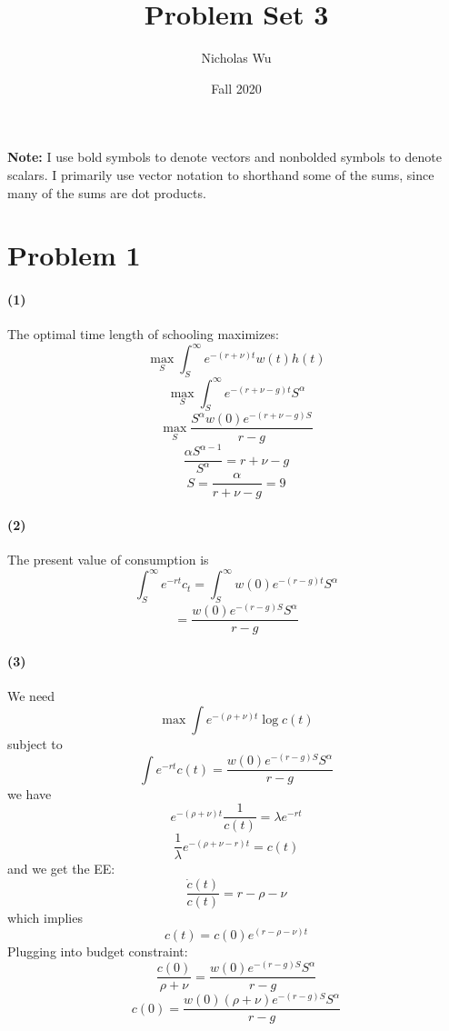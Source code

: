 \documentclass[10pt,letter]{article}
\newcommand{\problem}[1]{\section*{Problem #1}}
\newcommand{\problempart}[1]{\paragraph{#1}}
\begin{document}


\title{Problem Set 3}

\author{Nicholas Wu}

\date{Fall 2020}

\maketitle
\textbf{Note:} I use bold symbols to denote vectors and nonbolded symbols to denote scalars. I primarily use vector notation to shorthand some of the sums, since many of the sums are dot products.

\problem{1}

\problempart{(1)}
The optimal time length of schooling maximizes:
\[ \max_S \int_S^\infty e^{-(r + \nu)t}w(t)h(t) \]
\[ \max_S \int_S^\infty e^{-(r+ \nu - g)t}S^{\alpha} \]
\[ \max_S \frac{S^{\alpha}w(0)e^{-(r+ \nu-g)S}}{r-g} \]
\[ \frac{\alpha S^{\alpha - 1}}{S^\alpha} = r+ \nu-g\]
\[  S = \frac{\alpha}{r+ \nu-g} = 9\]
\problempart{(2)}
The present value of consumption is
\[ \int_S^\infty e^{-rt}c_t = \int_S^\infty w(0) e^{-(r-g)t}S^\alpha \]
\[  = \frac{w(0) e^{-(r-g)S}S^\alpha }{r-g}\]
\problempart{(3)}
We need
\[ \max  \int e^{-(\rho + \nu)t} \log c(t) \]
subject to
\[ \int e^{- rt}c(t) = \frac{w(0) e^{-(r-g)S}S^\alpha }{r-g} \]
we have
\[ e^{-(\rho + \nu)t} \frac{1}{c(t)} = \lambda e^{-rt}\]
\[ \frac{1}{\lambda }e^{-(\rho + \nu - r)t}  = c(t) \]
and we get the EE:
\[ \frac{\dot{c}(t)}{c(t)}= r - \rho - \nu  \]
which implies
\[ c(t) = c(0) e^{(r-\rho-\nu)t} \]
Plugging into budget constraint:
\[ \frac{c(0)}{\rho+\nu} = \frac{w(0) e^{-(r-g)S}S^\alpha }{r-g} \]
\[ c(0) = \frac{w(0)(\rho+\nu) e^{-(r-g)S}S^\alpha }{r-g} \]
\end{document}
